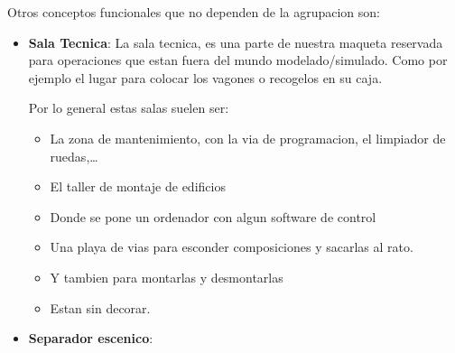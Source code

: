 Otros conceptos funcionales que no dependen de la agrupacion son:

 
\begin{itemize}
\item \textbf{Sala Tecnica}: La sala tecnica, es una parte de nuestra maqueta reservada para operaciones que estan fuera del mundo modelado/simulado. Como por ejemplo el lugar para colocar los vagones o recogelos en su caja.

Por lo general estas salas suelen ser:

\begin{itemize}
\item La zona de mantenimiento, con la via de programacion, el limpiador de ruedas,\dots
\item El taller de montaje de edificios
\item Donde se pone un ordenador con algun software de control
\item Una playa de vias para esconder composiciones y sacarlas al rato. 
\item Y tambien para montarlas y desmontarlas
\item Estan sin decorar.
\end{itemize}

\item \textbf{Separador escenico}:
\end{itemize}

 
